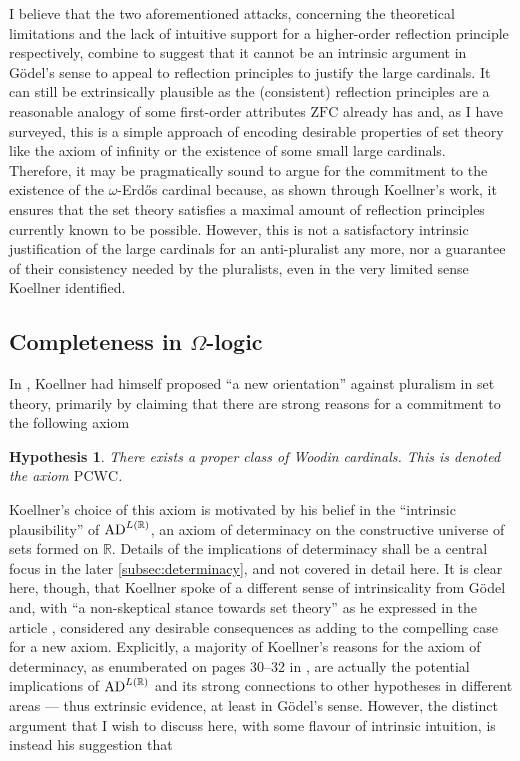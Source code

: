 \documentclass[12pt]{article}
\theoremstyle{plain}
\newtheorem*{hypothesis*}{Hypothesis}
\theoremstyle{definition}
\newcommand{\ZFC}{\mathrm{ZFC}}
\newcommand{\PCWC}{\mathrm{PCWC}}
\newcommand{\AD}{\mathrm{AD}}
\begin{document}
I believe that the two aforementioned attacks, concerning the theoretical limitations and the lack of intuitive support for a higher-order reflection principle respectively, combine to suggest that it cannot be an intrinsic argument in G\"odel's sense to appeal to reflection principles to justify the large cardinals. It can still be extrinsically plausible as the (consistent) reflection principles are a reasonable analogy of some first-order attributes $\ZFC$ already has and, as I have surveyed, this is a simple approach of encoding desirable properties of set theory like the axiom of infinity or the existence of some small large cardinals. Therefore, it may be pragmatically sound to argue for the commitment to the existence of the $\omega$-Erd\H{o}s cardinal because, as shown through Koellner's work, it ensures that the set theory satisfies a maximal amount of reflection principles currently known to be possible. However, this is not a satisfactory intrinsic justification of the large cardinals for an anti-pluralist any more, nor a guarantee of their consistency needed by the pluralists, even in the very limited sense Koellner identified.

\subsection{Completeness in \texorpdfstring{$\Omega$}{Omega}-logic}

In \cite{koellner-pluralism}, Koellner had himself proposed ``a new orientation'' against pluralism in set theory, primarily by claiming that there are strong reasons for a commitment to the following axiom

\begin{hypothesis*}
	There exists a proper class of Woodin cardinals. This is denoted the axiom $\PCWC$.
\end{hypothesis*}

Koellner's choice of this axiom is motivated by his belief in the ``intrinsic plausibility'' of $\AD^{L\mleft(\mathbb{R}\mright)}$, an axiom of determinacy on the constructive universe of sets formed on $\mathbb{R}$. Details of the implications of determinacy shall be a central focus in the later \autoref{subsec:determinacy}, and not covered in detail here. It is clear here, though, that Koellner spoke of a different sense of intrinsicality from G\"odel and, with ``a non-skeptical stance towards set theory'' as he expressed in the article \cite{koellner-absolute-undecidability}, considered any desirable consequences as adding to the compelling case for a new axiom. Explicitly, a majority of Koellner's reasons for the axiom of determinacy, as enumberated on pages 30--32 in \cite{koellner-pluralism}, are actually the potential implications of $\AD^{L\mleft(\mathbb{R}\mright)}$ and its strong connections to other hypotheses in different areas --- thus extrinsic evidence, at least in G\"odel's sense. However, the distinct argument that I wish to discuss here, with some flavour of intrinsic intuition, is instead his suggestion that
\end{document}
